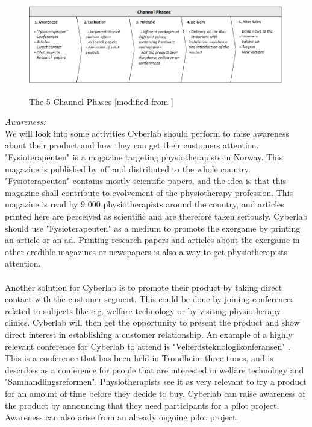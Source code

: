 \begin{figure}
\centering
\scalebox{0.60}
{\includegraphics{channels}}
\caption[The 5 Channel Phases]{The 5 Channel Phases [modified from \cite{osterwalder}\cite{osterwalderthesis}]}
\label{fig:Channels}
\end{figure}

\emph{Awareness:} \\ 
We will look into some activities Cyberlab should perform to raise awareness about their product and how they can get their customers attention. "Fysioterapeuten" is a magazine targeting physiotherapists in Norway. This magazine is published by \ac{nff} and distributed to the whole country. "Fysioterapeuten" contains mostly scientific papers, and the idea is that this magazine shall contribute to evolvement of the physiotherapy profession. This magazine is read by 9 000 physiotherapists around the country, and articles printed here are perceived as scientific and are therefore taken seriously. Cyberlab should use "Fysioterapeuten" as a medium to promote the exergame by printing an article or an ad. Printing research papers and articles about the exergame in other credible magazines or newspapers is also a way to get physiotherapists attention. \\ \\
Another solution for Cyberlab is to promote their product by taking direct contact with the customer segment. This could be done by joining conferences related to subjects like e.g. welfare technology or by visiting physiotherapy clinics. Cyberlab will then get the opportunity to present the product and show direct interest in establishing a customer relationship. An example of a highly relevant conference for Cyberlab to attend is "Velferdsteknologikonferansen" \cite{conference}. This is a conference that has been held in Trondheim three times, and is describes as a conference for people that are interested in welfare technology and "Samhandlingsreformen". Physiotherapists see it as very relevant to try a product for an amount of time before they decide to buy. Cyberlab can raise awareness of the product by announcing that they need participants for a pilot project. Awareness can also arise from an already ongoing pilot project. \\ \\
